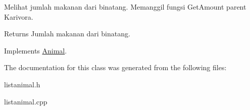 Melihat jumlah makanan dari binatang. Memanggil fungsi Get\+Amount parent Karivora. 

\begin{DoxyReturn}{Returns}
Jumlah makanan dari binatang. 
\end{DoxyReturn}


Implements \hyperlink{classAnimal_a3f1cced7bac93f7c88a24ec5a0e989fe}{Animal}.



The documentation for this class was generated from the following files\+:\begin{DoxyCompactItemize}
\item 
listanimal.\+h\item 
listanimal.\+cpp\end{DoxyCompactItemize}
